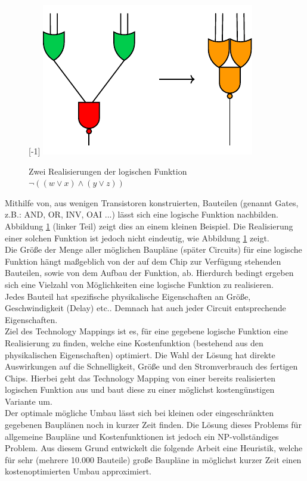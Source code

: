 \documentclass[11pt, a4paper, german]{article}
\newcommand{\TM}{Technology  Mapping }
\begin{document}
\begin{figure}
	\scalebox{1}[-1]{
		\includegraphics[]{pictures/compiled/einfBsp}
	}
		\caption{Zwei Realisierungen der logischen Funktion $\neg((w\lor x) \land (y \lor z))$}
		\label{bild:einfbsp}
\end{figure}
Mithilfe von, aus wenigen Transistoren konstruierten, Bauteilen (genannt Gates, z.B.: AND, OR, INV, OAI ...) lässt sich eine logische Funktion nachbilden. Abbildung \ref{bild:einfbsp} (linker Teil) zeigt dies an einem kleinen Beispiel.  Die Realisierung einer solchen Funktion ist jedoch nicht eindeutig, wie Abbildung \ref{bild:einfbsp}  zeigt. \\
Die Größe der Menge aller möglichen Baupläne (später Circuits) für eine logische Funktion hängt maßgeblich von der auf dem Chip zur Verfügung stehenden Bauteilen, sowie von dem Aufbau der Funktion, ab. Hierdurch bedingt ergeben sich eine Vielzahl von  Möglichkeiten eine logische Funktion zu realisieren.\\
 Jedes Bauteil hat spezifische physikalische Eigenschaften an Größe, Geschwindigkeit (Delay) etc.. Demnach hat auch jeder Circuit entsprechende Eigenschaften. \\
Ziel des Technology Mappings ist es, für eine gegebene logische Funktion eine Realisierung zu finden, welche eine Kostenfunktion (bestehend aus den physikalischen Eigenschaften) optimiert. Die Wahl der Lösung hat direkte Auswirkungen auf die  Schnelligkeit, Größe und den Stromverbrauch des fertigen Chips. Hierbei geht das \TM von einer bereits realisierten logischen Funktion aus und baut diese zu einer möglichst kostengünstigen Variante um. \\
Der optimale mögliche Umbau lässt sich bei kleinen oder eingeschränkten gegebenen Bauplänen noch in kurzer Zeit finden. Die Lösung dieses Problems für allgemeine Baupläne und Kostenfunktionen ist jedoch ein NP-vollständiges Problem. Aus diesem Grund entwickelt die folgende Arbeit eine Heuristik, welche für sehr (mehrere 10.000 Bauteile) große Baupläne in möglichst kurzer Zeit einen kostenoptimierten Umbau approximiert.\\
\end{document}
